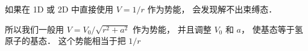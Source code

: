 
如果在 1D 或 2D 中直接使用 $V = 1/r$ 作为势能， 会发现解不出束缚态．

所以我们一般用 $V = V_0/\sqrt{r^2 + a^2}$ 作为势能， 并且调整 $V_0$ 和 $a$， 使基态等于氢原子的基态． 这个势能相当于把 $1/r$ 

